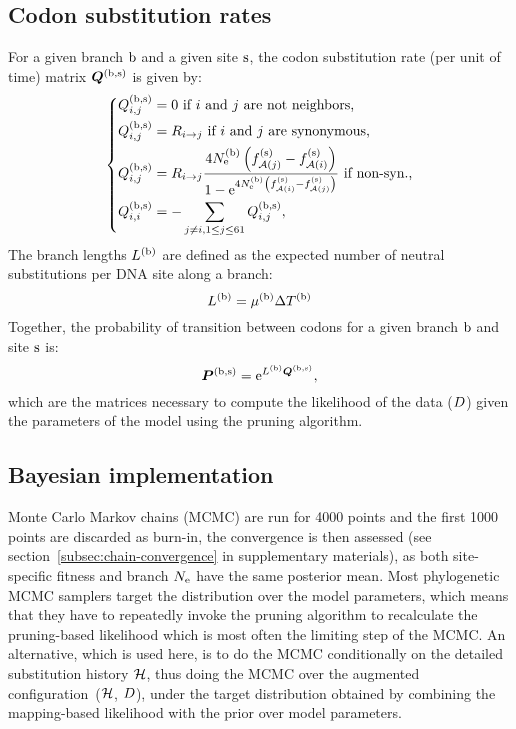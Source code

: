 \subsection{Codon {substitution} rates}
For a given branch $\text{b}$ and a given site $\text{s}$, the codon substitution rate (per unit of time) matrix $\bm{Q}^{(\text{b}, \text{s})}$ is given by:
\begin{equation}
    \label{eq:subrates}
    \begin{dcases}
        \submatrix\branchsiteexp_{\itoj} = 0\text{ if $\ci$ and $\cj$ are not neighbors,} \\
        \submatrix\branchsiteexp_{\itoj} = \mutmatrix_{\nucitoj}\text{ if $\ci$ and $\cj$ are synonymous,} \\
        \submatrix\branchsiteexp_{\itoj} = \mutmatrix_{\nucitoj} \dfrac{4\Ne\branchexp \left({\fitj\siteexp - \fiti\siteexp}\right)}{{1 - \e^{4\Ne\branchexp\left({\fiti\siteexp - \fitj\siteexp}\right)} }} \text{ if non-syn.,}\\
        \submatrix\branchsiteexp_{\ci, \ci} = - \sum\limits_{ \cj \neq \ci, \jSetCodon} \submatrix\branchsiteexp_{\itoj},
    \end{dcases}
\end{equation}
The branch lengths $L^{(\text{b})}$ are defined as the expected number of neutral substitutions per \acrshort{DNA} site along a branch:
\begin{equation}
    \label{eq:branchlength}
    \branchlength\branchexp = \mu\branchexp \branchtime\branchexp
\end{equation}
Together, the probability of {transition} between codons for a given branch $\text{b}$ and site $\text{s}$ is:
\begin{equation}
    \label{eq:Probmatrix}
    \Probmatrix\branchsiteexp = \e^{\branchlength\branchexp \Submatrix\branchsiteexp},
\end{equation}
which are the matrices necessary to compute the likelihood of the data ($D$) given the parameters of the model using the pruning algorithm.

\subsection{Bayesian implementation}
\label{sec:Bayesian}
Monte Carlo Markov chains (\acrshort{MCMC}) are run for 4000 points and the first 1000 points are discarded as burn-in, the convergence is then assessed (see section~\ref{subsec:chain-convergence} in supplementary materials), as both site-specific fitness and branch $N_{\mathrm{e}}$ have the same posterior mean.
Most phylogenetic MCMC samplers target the distribution over the model parameters, which means that they have to repeatedly invoke the pruning algorithm to recalculate the pruning-based likelihood which is most often the limiting step of the \acrshort{MCMC}.
An alternative, which is used here, is to do the \acrshort{MCMC} conditionally on the detailed substitution history $\mathcal{H}$, thus doing the \acrshort{MCMC} over the augmented configuration~($\mathcal{H}$, $D$), under the target distribution obtained by combining the mapping-based likelihood with the prior over model parameters.


